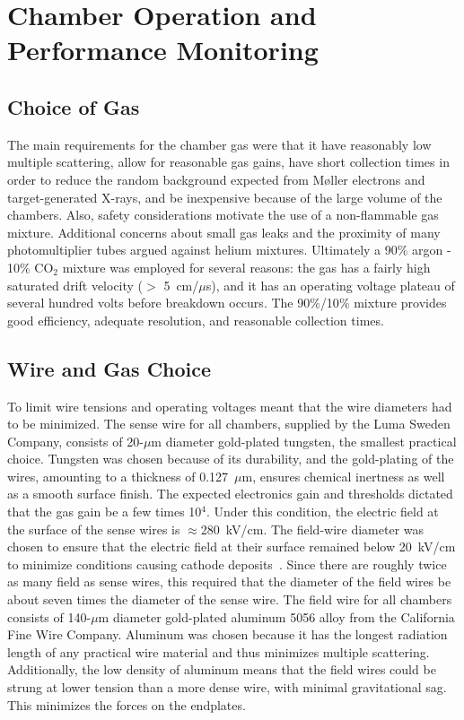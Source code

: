 \section{Chamber Operation and Performance Monitoring}

\subsection{Choice of Gas}
\hskip 0.15in

The main requirements for the chamber gas were that it have reasonably low 
multiple scattering, allow for reasonable gas gains, have short collection 
times in order to reduce the random background expected from M{\o}ller 
electrons and target-generated X-rays, and be inexpensive because of the 
large volume of the chambers. Also, safety considerations motivate the use of
a non-flammable gas mixture.  Additional concerns about small gas 
leaks and the proximity of many photomultiplier tubes argued against helium 
mixtures.  Ultimately a 90$\%$ argon - 10$\%$ CO$_2$ mixture was employed 
for several reasons: the gas has a fairly high saturated drift velocity 
($>$ 5~cm/$\mu$s), and it has an operating voltage plateau of several hundred 
volts before breakdown occurs.  The 90$\%$/10$\%$ mixture 
provides good efficiency, adequate resolution, and reasonable collection times.

\subsection{Wire and Gas Choice}

\hskip 0.15in
To limit wire tensions and operating voltages meant that the wire diameters 
had to be minimized.  The sense wire for all chambers, supplied by the Luma
Sweden Company, consists of 20-$\mu$m diameter gold-plated tungsten, the 
smallest practical choice.  Tungsten was chosen because of its durability, 
and the gold-plating of the wires, amounting to a thickness of 0.127~$\mu$m, 
ensures chemical inertness as well as a smooth surface finish.  The expected 
electronics gain and thresholds dictated that the gas gain be a few times 
10$^4$.  Under this condition, the electric field at the surface of the sense 
wires is $\approx$280~kV/cm.  The field-wire diameter was chosen to ensure 
that the electric field at their surface remained below 20~kV/cm to minimize 
conditions causing cathode deposits~\cite{kadyk,cathode}.  Since there are 
roughly twice as many field as sense wires, this required that the diameter 
of the field wires be about seven times the diameter of the sense wire.  The 
field wire for all chambers consists of 140-$\mu$m diameter gold-plated 
aluminum 5056 alloy from the California Fine Wire Company.  Aluminum was 
chosen because it has the longest radiation length of any practical wire 
material and thus minimizes multiple scattering.  Additionally, the low density 
of aluminum means that the field wires could be strung at lower tension than a 
more dense wire, with minimal gravitational sag.  This minimizes the forces on 
the endplates.

